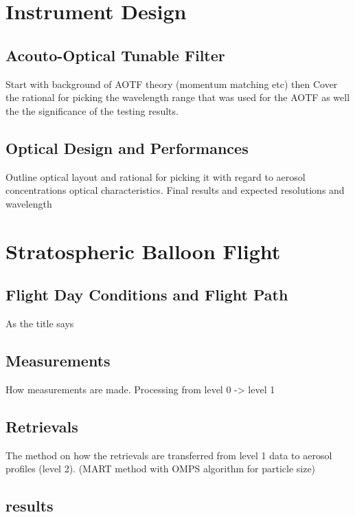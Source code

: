 \documentclass[12pt]{article}
\begin{document}
\section{Instrument Design}

\subsection{Acouto-Optical Tunable Filter}

Start with background of AOTF theory (momentum matching etc) then Cover the rational for picking the wavelength range that was used for the AOTF as well the the significance of the testing results.

\subsection{Optical Design and Performances}

Outline optical layout and rational for picking it with regard to aerosol concentrations optical characteristics. Final results and expected resolutions and wavelength

\section{Stratospheric Balloon Flight}

\subsection{Flight Day Conditions and Flight Path}

As the title says

\subsection{Measurements}

How measurements are made. Processing from level 0 -> level 1

\subsection{Retrievals}

The method on how the retrievals are transferred from level 1 data to aerosol profiles (level 2). (MART method with OMPS algorithm for particle size)

\subsection{results}
\end{document}
